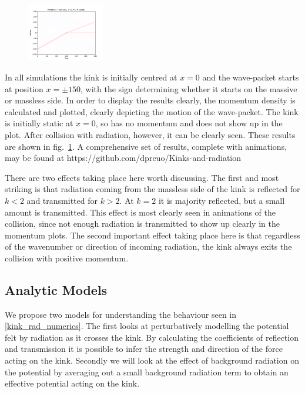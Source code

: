 \documentclass[11pt, oneside]{article}  	%
\numberwithin{equation}{section}
\begin{document}
\begin{figure}
\includegraphics[width=0.3\textwidth]{MomentumDensityk275Massless.pdf}
 \label{radiation_results}
\end{figure}
In all simulations the kink is initially centred at $x=0$ and the wave-packet starts at position $x=\pm150$, with the sign determining whether it starts on the massive or massless side. In order to display the results clearly, the momentum density is calculated and plotted, clearly depicting the motion of the wave-packet. The kink is initially static at $x=0$, so has no momentum and does not show up in the plot. After collision with radiation, however, it can be clearly seen. These results are shown in fig.~\ref{radiation_results}. A comprehensive set of results, complete with animations, may be found at https://github.com/dpreuo/Kinks-and-radiation\par
There are two effects taking place here worth discussing. The first and most striking is that radiation coming from the massless side of the kink is reflected for $k < 2$ and transmitted for $k>2$. At $k = 2$ it is majority reflected, but a small amount is transmitted. This effect is most clearly seen in animations of the collision, since not enough radiation is transmitted to show up clearly in the momentum plots. The second important effect taking place here is that regardless of the wavenumber or direction of incoming radiation, the kink always exits the collision with positive momentum. 

 \subsection{Analytic Models} \label{rad-anal}
 We propose two models for understanding the behaviour seen in \textsection \ref{kink_rad_numerics}. The first looks at perturbatively modelling the potential felt by radiation as it crosses the kink. By calculating the coefficients of reflection and transmission it is possible to infer the strength and direction of the force acting on the kink. Secondly we will look at the effect of background radiation on the potential by averaging out a small background radiation term to obtain an effective potential acting on the kink.
\end{document}
